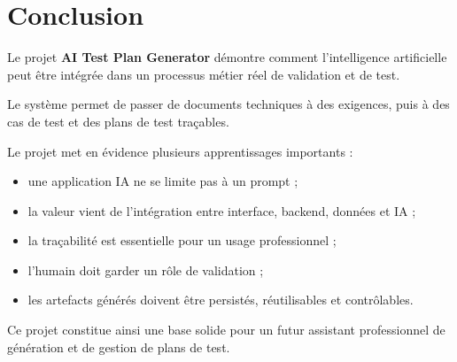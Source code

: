 \documentclass[
  french,
]{report}
\providecommand{\tightlist}{%
  \setlength{\itemsep}{0pt}\setlength{\parskip}{0pt}}
\begin{document}
\chapter{Conclusion}\label{conclusion}

Le projet \textbf{AI Test Plan Generator} démontre comment
l'intelligence artificielle peut être intégrée dans un processus métier
réel de validation et de test.

Le système permet de passer de documents techniques à des exigences,
puis à des cas de test et des plans de test traçables.

Le projet met en évidence plusieurs apprentissages importants :

\begin{itemize}
\tightlist
\item
  une application IA ne se limite pas à un prompt ;
\item
  la valeur vient de l'intégration entre interface, backend, données et
  IA ;
\item
  la traçabilité est essentielle pour un usage professionnel ;
\item
  l'humain doit garder un rôle de validation ;
\item
  les artefacts générés doivent être persistés, réutilisables et
  contrôlables.
\end{itemize}

Ce projet constitue ainsi une base solide pour un futur assistant
professionnel de génération et de gestion de plans de test.
\end{document}

